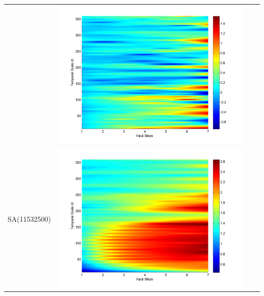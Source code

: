\documentclass[11pt]{article}
\begin{document}
\begin{table}[H]
{\begin{tabular}{cccc}
&\begin{minipage}{.3\textwidth}\includegraphics[width=\linewidth]{resultgraph/05585000diff_q.png}\end{minipage}
\\
SA(11532500)
&\begin{minipage}{.3\textwidth}\includegraphics[width=\linewidth]{resultgraph/11532500p.png}\end{minipage}

\end{tabular}}
\end{table}
\end{document}
